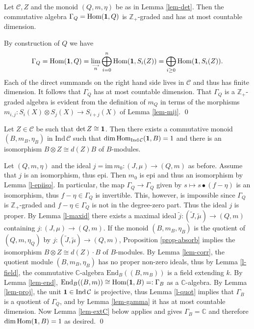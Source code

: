 \documentclass[12pt]{article}
\theoremstyle{definition}
\theoremstyle{definition}
\theoremstyle{remark}
\def\2#1{{\mathcal #1}}
\def\7#1{{\mathbb #1}}
\def\1#1{{\bf #1}}
\newcommand{\Hom}{\mathrm{Hom}}
\newcommand{\End}{\mathrm{End}}
\newcommand{\rarr}{\rightarrow}
\begin{document}
\blemma  \label{lem-gamma}
Let $\2C, Z$ and the monoid $(Q,m,\eta)$ be as in Lemma \ref{lem-det}. Then the
commutative algebra $\Gamma_Q=\Hom(\11,Q)$ is $\7Z_+$-graded and has at most countable dimension.
\elemma

\prf By construction of $Q$ we have
\[ \Gamma_Q=\Hom(\11,Q)=\lim_{\stackrel{\longrightarrow}{n}}\bigoplus_{i=0}^n\Hom(\11,S_i(Z))
   =\bigoplus_{i\ge 0}\Hom(\11,S_i(Z)). \] 
Each of the direct summands on the right hand side lives in $\2C$ and thus has finite dimension. It
follows that $\Gamma_Q$ has at most countable dimension. That $\Gamma_Q$ is a $\7Z_+$-graded algebra
is evident from the definition of $m_Q$ in terms of the morphisms 
$m_{i,j}: S_i(X)\otimes S_j(X)\rarr S_{i+j}(X)$ of Lemma \ref{lem-mij}.
\qed

\btheor \label{theor-absorb}
Let $Z\in\2C$ be such that $\det Z\cong\11$. Then there exists a commutative monoid $(B,m_B,\eta_B)$ 
in $\mathrm{Ind}\,\2C$ such that $\dim\Hom_{\mathrm{Ind}\,\2C}(\11,B)=1$ and there is an isomorphism 
$B\otimes Z\cong d(Z)B$ of $B$-modules.
\etheor

\prf Let $(Q,m,\eta)$ and the ideal $j=\mathrm{im}\,m_0:(J,\mu)\rarr(Q,m)$ as before. Assume that
$j$ is an isomorphism, thus epi. Then $m_0$ is epi and thus an isomorphism by Lemma
\ref{l-epiiso}. In particular, the map $\Gamma_Q\rarr\Gamma_Q$ given by $s\mapsto s\bullet(f-\eta)$ 
is an isomorphism, thus $f-\eta\in\Gamma_Q$ is invertible. This, however, is impossible since
$\Gamma_Q$ is $\7Z_+$-graded and $f-\eta\in\Gamma_Q$ is not in the degree-zero part. Thus the ideal
$j$ is proper. By Lemma \ref{l-maxid} there exists a maximal ideal
$\widetilde{j}:(\widetilde{J},\widetilde{\mu})\rarr(Q,m)$ 
containing $j:(J,\mu)\rarr(Q,m)$. If the monoid $(B,m_B,\eta_B)$ is the quotient of $(Q,m,\eta_Q)$
by $j:(\widetilde{J},\widetilde{\mu})\rarr(Q,m)$, Proposition \ref{prop-absorb} implies the
isomorphism $B\otimes Z\cong d(Z)\cdot B$ of $B$-modules. By Lemma \ref{lem-corr}, the quotient 
module $(B,m_B,\eta_B)$ has no proper non-zero ideals, thus by Lemma \ref{l-field}, the commutative
$\7C$-algebra $\End_B((B,m_B))$ is a field extending $k$. By Lemma \ref{lem-end}, 
$\End_B((B,m))\cong\Hom(\11,B)=:\Gamma_B$ as a $\7C$-algebra. By Lemma \ref{lem-proj}, the unit
$\11\in\mathrm{Ind}\,\2C$ is projective, thus Lemma \ref{l-quot} implies that $\Gamma_B$ is a
quotient of $\Gamma_Q$, and by Lemma \ref{lem-gamma} it has at most countable dimension. Now Lemma
\ref{lem-extC} below applies and gives $\Gamma_B=\7C$ and therefore $\dim\Hom(\11,B)=1$ as desired. 
\qed
\end{document}
